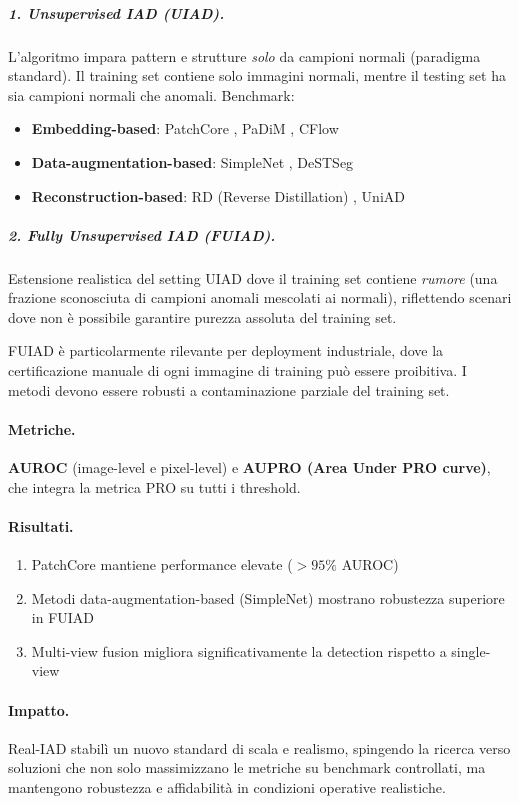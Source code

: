 \subparagraph{1. Unsupervised IAD (UIAD).} L'algoritmo impara pattern e strutture \textit{solo} da campioni normali (paradigma standard). Il training set contiene solo immagini normali, mentre il testing set ha sia campioni normali che anomali. Benchmark:
\begin{itemize}
\item \textbf{Embedding-based}: PatchCore \cite{roth2022towards}, PaDiM \cite{defard2021padim}, CFlow \cite{gudovskiy2022cflow}
\item \textbf{Data-augmentation-based}: SimpleNet \cite{liu2023simplenet}, DeSTSeg \cite{zhang2023destseg}
\item \textbf{Reconstruction-based}: RD (Reverse Distillation) \cite{deng2022anomaly}, UniAD \cite{you2022unified}
\end{itemize}

\subparagraph{2. Fully Unsupervised IAD (FUIAD).} Estensione realistica del setting UIAD dove il training set contiene \textit{rumore} (una frazione sconosciuta di campioni anomali mescolati ai normali), riflettendo scenari dove non è possibile garantire purezza assoluta del training set.

FUIAD è particolarmente rilevante per deployment industriale, dove la certificazione manuale di ogni immagine di training può essere proibitiva. I metodi devono essere robusti a contaminazione parziale del training set.

\paragraph{Metriche.} \textbf{AUROC} (image-level e pixel-level) e \textbf{AUPRO (Area Under PRO curve)}, che integra la metrica PRO su tutti i threshold.

\paragraph{Risultati.}
\begin{enumerate}
\item PatchCore mantiene performance elevate ($>95\%$ AUROC) 
\item Metodi data-augmentation-based (SimpleNet) mostrano robustezza superiore in FUIAD
\item Multi-view fusion migliora significativamente la detection rispetto a single-view
\end{enumerate}

\paragraph{Impatto.} Real-IAD stabilì un nuovo standard di scala e realismo, spingendo la ricerca verso soluzioni che non solo massimizzano le metriche su benchmark controllati, ma mantengono robustezza e affidabilità in condizioni operative realistiche. 

